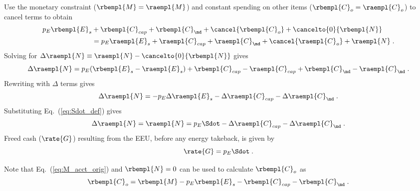 \begin{landscape}
{Use the monetary constraint ($\rbempl{M} = \raempl{M}$)
and constant spending on other items ($\rbempl{C}_o = \raempl{C}_o$) to cancel terms to obtain
%
\begin{align}
  p_E \rbempl{E}_s &+ \rbempl{C}_{cap} + \rbempl{C}_{\md} + \cancel{\rbempl{C}_o} + \cancelto{0}{\rbempl{N}} \nonumber \\
                   &= p_E \raempl{E}_s + \raempl{C}_{cap} + \raempl{C}_{\md} + \cancel{\raempl{C}_o}  + \raempl{N} \; .
\end{align}
%
Solving for $\Delta \raempl{N} \equiv \raempl{N} - \cancelto{0}{\rbempl{N}}$ gives 
%
\begin{equation}
  \Delta \raempl{N} = p_E(\rbempl{E}_s - \raempl{E}_s) 
                      + \rbempl{C}_{cap} - \raempl{C}_{cap}
                      + \rbempl{C}_{\md} - \raempl{C}_{\md} \; .
\end{equation}
%
Rewriting with $\Delta$ terms gives
%
\begin{equation}
  \Delta \raempl{N} = - p_E \Delta \raempl{E}_s - \Delta \raempl{C}_{cap} - \Delta \raempl{C}_{\md} \; .
\end{equation}
%
Substituting Eq.~(\ref{eq:Sdot_def}) gives
%
\begin{equation} \label{eq:N_dot_star_empl}
  \Delta \raempl{N} = \raempl{N} = p_E \Sdot - \Delta \raempl{C}_{cap} - \Delta \raempl{C}_{\md} \; .
\end{equation}
%
Freed cash ($\rate{G}$) resulting from the EEU, 
before any energy takeback, is given by 
%
\begin{equation} \label{eq:G_dot}
  \rate{G} = p_E \Sdot \; .
\end{equation}

Note that Eq.~(\ref{eq:M_acct_orig}) and $\rbempl{N} = 0$ can be used to calculate $\rbempl{C}_o$ as
%
\begin{equation} \label{eq:C_dot_o}
  \rbempl{C}_o = \rbempl{M} - p_E \rbempl{E}_s - \rbempl{C}_{cap} - \rbempl{C}_{\md} \; .
\end{equation}
%

}
\end{landscape}
